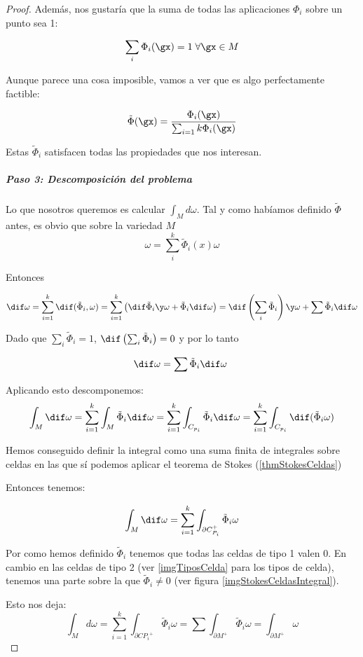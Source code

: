 \begin{proof}
Además, nos gustaría que la suma de todas las aplicaciones $Φ_i$ sobre un punto sea 1:

\[ \sum_i \Phi_{i}(\gx) = 1\;\forall \gx \in M\]

Aunque parece una cosa imposible, vamos a ver que es algo perfectamente factible:

\[\tilde{\Phi}(\gx) = \frac{\Phi_i (\gx)}{\sum_{i=1}{k}\Phi_i(\gx)}\]

Estas $\tilde{\Phi}_i$ satisfacen todas las propiedades que nos interesan.

\subparagraph{Paso 3: Descomposición del problema}

Lo que nosotros queremos es calcular $\int_M d\omega$. Tal y como habíamos definido $\tilde{Φ}$ antes, es obvio que sobre la variedad $M$
\[ \omega=\sum_i^k\tilde{\Phi}_i(x)\omega \]

Entonces

\[\dif \omega = \sum_{i=1}^k \dif (\tilde{\Phi}_i,\omega) = \sum_{i=1}^k \left( \dif \tilde{\Phi}_i\y \omega + \tilde{\Phi}_i \dif \omega \right) =  \dif\left(\sum_i \tilde{\Phi}_i\right) \y \omega + \sum \tilde{\Phi}_i \dif \omega\]

Dado que $\sum_i \tilde{Φ}_i = 1$, $\dif\left(\sum_i \tilde{\Phi}_i\right) = 0$ y por lo tanto

\[ \dif \omega = \sum \tilde{\Phi}_i \dif \omega \]

Aplicando esto descomponemos:
\[\int_M \dif \omega = \sum_{i=1}^k \int_M \tilde{\Phi}_i \dif\omega = \sum_{i=1}^k \int_{C_{p_i}} \tilde{\Phi}_i \dif\omega=\sum_{i=1}^k \int_{C_{p_i}} \dif(\tilde{\Phi}_i\omega)
\]

Hemos conseguido definir la integral como una suma finita de integrales sobre celdas en las que sí podemos aplicar el teorema de Stokes (\ref{thmStokesCeldas})

Entonces tenemos:

\[\int_M \dif \omega = \sum_{i=1}^k \int_{\partial  C_{P_i}^{+}} \tilde{\Phi}_i\omega\]

Por como hemos definido $\tilde{\Phi}_i$ tenemos que todas las celdas de tipo 1 valen 0. En cambio en las celdas de tipo 2 (ver \ref{imgTiposCelda} para los tipos de celda), tenemos una parte sobre la que $\tilde{\Phi}_i \neq 0$ (ver figura \ref{imgStokesCeldasIntegral}).

Esto nos deja: \[\int_M d\omega = \sum_{i=1}^k \int_{\partial  C{P_i}^{+}} \tilde{\Phi}_i\omega = \sum \int_{\partial M^+} \tilde{\Phi}_i \omega = \int_{\partial M^+} \omega\]

\end{proof}

